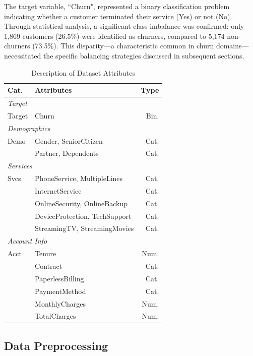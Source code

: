 \documentclass[a4paper,twoside]{article}
\begin{document}
The target variable, ``Churn", represented a binary classification problem indicating whether a customer terminated their service (Yes) or not (No). Through statistical analysis, a significant class imbalance was confirmed: only 1,869 customers (26.5\%) were identified as churners, compared to 5,174 non-churners (73.5\%). This disparity—a characteristic common in churn domains—necessitated the specific balancing strategies discussed in subsequent sections.

\begin{table}[H]
\caption{Description of Dataset Attributes}
\label{tab:dataset_variables}
\centering
\footnotesize
\begin{tabularx}{\columnwidth}{l X r} 
\hline
\textbf{Cat.} & \textbf{Attributes} & \textbf{Type} \\
\hline
\multicolumn{3}{l}{\textit{Target}} \\
Target & Churn & Bin. \\
\hline
\multicolumn{3}{l}{\textit{Demographics}} \\
Demo & Gender, SeniorCitizen & Cat. \\
 & Partner, Dependents & Cat. \\
\hline
\multicolumn{3}{l}{\textit{Services}} \\
Svcs & PhoneService, MultipleLines & Cat. \\
 & InternetService & Cat. \\
 & OnlineSecurity, OnlineBackup & Cat. \\
 & DeviceProtection, TechSupport & Cat. \\
 & StreamingTV, StreamingMovies & Cat. \\
\hline
\multicolumn{3}{l}{\textit{Account Info}} \\
Acct & Tenure & Num. \\
 & Contract & Cat. \\
 & PaperlessBilling & Cat. \\
 & PaymentMethod & Cat. \\
 & MonthlyCharges & Num. \\
 & TotalCharges & Num. \\
\hline
\end{tabularx}
\end{table}

\subsection{Data Preprocessing}
\end{document}
